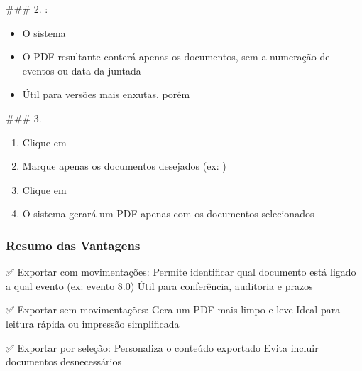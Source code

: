 \documentclass[letterpaper,10pt,brazil]{sphinxmanual}
\begin{document}
\sphinxAtStartPar
\#\#\# 2. : 
\begin{itemize}
\item {} 
\sphinxAtStartPar
O sistema 

\item {} 
\sphinxAtStartPar
O PDF resultante conterá apenas os documentos, sem a numeração de eventos ou data da juntada

\item {} 
\sphinxAtStartPar
Útil para versões mais enxutas, porém 

\end{itemize}

\sphinxAtStartPar
\#\#\# 3. 
\begin{enumerate}
%
\item {} 
\sphinxAtStartPar
Clique em 

\item {} 
\sphinxAtStartPar
Marque apenas os documentos desejados (ex: )

\item {} 
\sphinxAtStartPar
Clique em 

\item {} 
\sphinxAtStartPar
O sistema gerará um PDF apenas com os documentos selecionados

\end{enumerate}


\subsubsection{Resumo das Vantagens}
\label{\detokenize{projud_18_exportarprocesso:resumo-das-vantagens}}
\sphinxAtStartPar
✅ Exportar com movimentações:
\sphinxhyphen{} Permite identificar qual documento está ligado a qual evento (ex: evento 8.0)
\sphinxhyphen{} Útil para conferência, auditoria e prazos

\sphinxAtStartPar
✅ Exportar sem movimentações:
\sphinxhyphen{} Gera um PDF mais limpo e leve
\sphinxhyphen{} Ideal para leitura rápida ou impressão simplificada

\sphinxAtStartPar
✅ Exportar por seleção:
\sphinxhyphen{} Personaliza o conteúdo exportado
\sphinxhyphen{} Evita incluir documentos desnecessários
\end{document}
